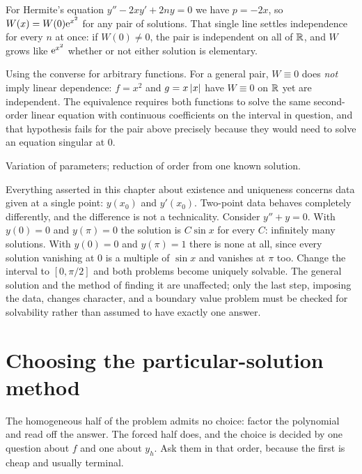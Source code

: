 \begin{worked}
For Hermite's equation $y''-2xy'+2ny=0$ we have $p=-2x$, so $W(x)=W(0)\mathrm{e}^{x^{2}}$ for any pair of solutions. That single line settles independence for every $n$ at once: if $W(0)\ne0$, the pair is independent on all of $\mathbb{R}$, and $W$ grows like $\mathrm{e}^{x^{2}}$ whether or not either solution is elementary.
\end{worked}

\begin{trap}
Using the converse for arbitrary functions. For a general pair, $W\equiv0$ does \emph{not} imply linear dependence: $f=x^{2}$ and $g=x\left\lvert x\right\rvert$ have $W\equiv0$ on $\mathbb{R}$ yet are independent. The equivalence requires both functions to solve the same second-order linear equation with continuous coefficients on the interval in question, and that hypothesis fails for the pair above precisely because they would need to solve an equation singular at $0$.
\end{trap}

\begin{seealsob}Variation of parameters; reduction of order from one known solution.\end{seealsob}

\begin{keynote}
Everything asserted in this chapter about existence and uniqueness concerns data given at a single point: $y(x_0)$ and $y'(x_0)$. Two-point data behaves completely differently, and the difference is not a technicality. Consider $y''+y=0$. With $y(0)=0$ and $y(\pi)=0$ the solution is $C\sin x$ for every $C$: infinitely many solutions. With $y(0)=0$ and $y(\pi)=1$ there is none at all, since every solution vanishing at $0$ is a multiple of $\sin x$ and vanishes at $\pi$ too. Change the interval to $[0,\pi/2]$ and both problems become uniquely solvable. The general solution and the method of finding it are unaffected; only the last step, imposing the data, changes character, and a boundary value problem must be checked for solvability rather than assumed to have exactly one answer.
\end{keynote}

\section{Choosing the particular-solution method}

The homogeneous half of the problem admits no choice: factor the polynomial and read off the answer. The forced half does, and the choice is decided by one question about $f$ and one about $y_h$. Ask them in that order, because the first is cheap and usually terminal.

